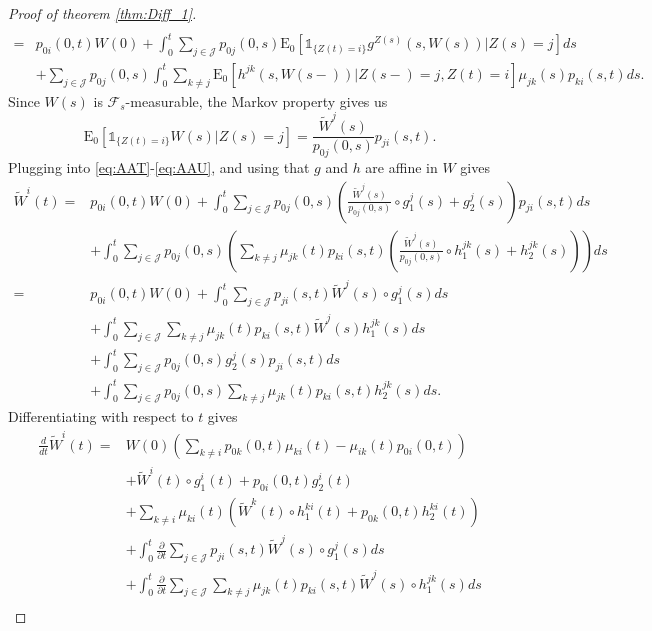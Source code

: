 \documentclass[12pt]{article}
\newcommand{\E}{\text{E}}
\newcommand{\indic}[1]{\mathds{1}_{ \{ #1 \} }}
\theoremstyle{my_thm}
\begin{document}
\begin{proof}[Proof of theorem \ref{thm:Diff_1}]
\begin{align}
\nonumber \\
=&
p_{0i}(0,t)W(0)+
\int_0^t \sum_{j \in \mathcal{J}} p_{0j}(0,s) \E_0 \left[ \indic{Z(t)=i} g^{Z(s)}(s,W(s))|Z(s)=j\right] ds \label{eq:AAT}
\\
&+
\sum_{j \in \mathcal{J}} p_{0j}(0,s)  \int_0^t \sum_{k \neq j }   \E_0 \left[ h^{jk}(s,W(s-))  |Z(s-)=j,Z(t)=i \right] \mu_{jk}(s)p_{ki}(s,t) ds. \label{eq:AAU}
\end{align}
Since $W(s)$ is $\mathcal{F}_s$-measurable, the Markov property gives us
$$
\E_0[\indic{Z(t)=i}W(s)|Z(s)=j]=\frac{\tilde{W}^j(s)}{p_{0j}(0,s)}p_{ji}(s,t).
$$
Plugging into \eqref{eq:AAT}-\eqref{eq:AAU}, and using that $g$ and $h$ are affine in $W$ gives
\begin{align*}
\tilde{W}^i(t)=&p_{0i}(0,t)W(0)+
\int_0^t \sum_{j \in \mathcal{J}} p_{0j}(0,s)\left( \frac{\tilde{W}^j(s)}{p_{0j}(0,s)}\circ g_1^j(s)+g^j_2(s)\right)p_{ji}(s,t) ds
\\
&+
\int_0^t \sum_{j \in \mathcal{J}} p_{0j}(0,s)  \left( \sum_{k \neq j}  \mu_{jk}(t)p_{ki}(s,t) \left(  \frac{\tilde{W}^j(s)}{p_{0j}(0,s)} \circ h_1^{jk}(s)+h_2^{jk}(s)  \right) \right) ds
 \\
=&p_{0i}(0,t)W(0)+
\int_0^t \sum_{j \in \mathcal{J}} p_{ji}(s,t) \tilde{W}^j(s)\circ g_1^j(s) ds
\\
&+
\int_0^t \sum_{j \in \mathcal{J}} \sum_{k \neq j}  \mu_{jk}(t) p_{ki}(s,t) \tilde{W}^j(s) h^{jk}_1(s)  ds
\\
&+
\int_0^t \sum_{j \in \mathcal{J}} p_{0j}(0,s)g_2^j(s)p_{ji}(s,t) ds
\\
&+
\int_0^t \sum_{j \in \mathcal{J}} p_{0j}(0,s)  \sum_{k \neq j}  \mu_{jk}(t) p_{ki}(s,t)h^{jk}_2(s) ds.
\end{align*}
Differentiating with respect to $t$ gives
\begin{align*}
\frac{d}{dt}\tilde{W}^i(t)=&
W(0)
\left(\sum_{k \neq i} p_{0k}(0,t)\mu_{ki}(t) - \mu_{ik}(t)p_{0i}(0,t)\right)
\\
&+
\tilde{W}^i(t)\circ g_1^i(t)+p_{0i}(0,t)g^i_2(t)\\
&+
\sum_{k \neq i} \mu_{ki}(t) \left( \tilde{W}^k(t)\circ  h_1^{ki}(t) + p_{0k}(0,t)h^{ki}_2(t) \right)
\\
&+
\int_0^t \frac{\partial}{\partial t}  \sum_{j \in \mathcal{J}} p_{ji}(s,t) \tilde{W}^j(s)\circ g_1^j(s) ds
\\
&+
\int_0^t \frac{\partial}{\partial t}  \sum_{j \in \mathcal{J}} \sum_{k \neq j}  \mu_{jk}(t) p_{ki}(s,t) \tilde{W}^j(s)\circ  h^{jk}_1(s)  ds
\\

\end{align*}
\end{proof}
\end{document}

